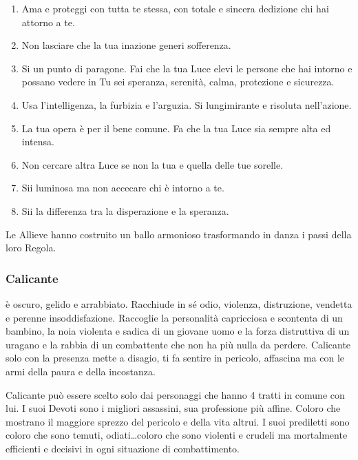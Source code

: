 \documentclass[a4paper,11pt,twoside,openany]{book}
\begin{document}
\begin{enumerate}
	\item Ama e proteggi con tutta te stessa, con totale e sincera dedizione chi hai attorno a te.

	\item Non lasciare che la tua inazione generi sofferenza.

	\item Si un punto di paragone. Fai che la tua Luce elevi le persone che hai intorno e possano vedere in Tu sei speranza, serenità, calma, protezione e sicurezza.

	\item Usa l'intelligenza, la furbizia e l'arguzia. Si lungimirante e risoluta nell'azione.

	\item La tua opera è per il bene comune. Fa che la tua Luce sia sempre alta ed intensa.

	\item Non cercare altra Luce se non la tua e quella delle tue sorelle.

	\item Sii luminosa ma non accecare chi è intorno a te.

	\item Sii la differenza tra la disperazione e la speranza.
\end{enumerate}

Le Allieve hanno costruito un ballo armonioso trasformando in danza i passi della loro Regola.

\subsubsection{Calicante}

\label{calicante}

è oscuro, gelido e arrabbiato. Racchiude in sé odio, violenza, distruzione, vendetta e perenne insoddisfazione. Raccoglie la personalità capricciosa e scontenta di un bambino, la noia violenta e sadica di un giovane uomo e la forza distruttiva di un uragano e la rabbia di un combattente che non ha più nulla da perdere. Calicante solo con la presenza mette a disagio, ti fa sentire in pericolo, affascina ma con le armi della paura e della incostanza.

Calicante può essere scelto solo dai personaggi che hanno 4 tratti in comune con lui. I suoi Devoti sono i migliori assassini, sua professione più affine. Coloro che mostrano il maggiore sprezzo del pericolo e della vita altrui. I suoi prediletti sono coloro che sono temuti, odiati\ldots coloro che sono violenti e crudeli ma mortalmente efficienti e decisivi in ogni situazione di combattimento.
\end{document}
